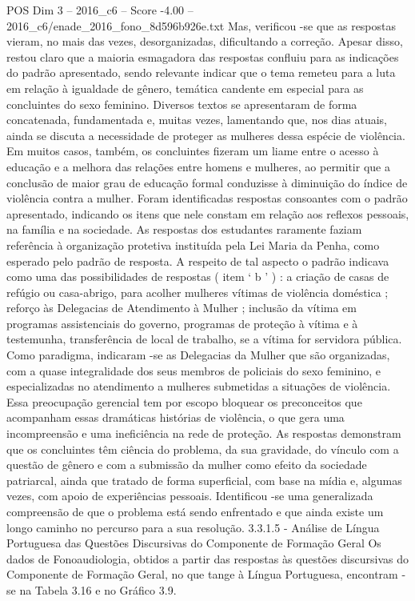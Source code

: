 \begin{textsample}{POS Dim 3 – 2016\_c6 – Score -4.00 – 2016\_c6/enade\_2016\_fono\_8d596b926e.txt}
Mas, verificou -se que as respostas vieram, no mais das vezes, desorganizadas, dificultando a correção.
Apesar disso, restou claro que a maioria esmagadora das respostas confluiu para as indicações do padrão apresentado, sendo relevante indicar que o tema remeteu para a luta em relação à igualdade de gênero, temática candente em especial para as concluintes do sexo feminino.
Diversos textos se apresentaram de forma concatenada, fundamentada e, muitas vezes, lamentando que, nos dias atuais, ainda se discuta a necessidade de proteger as mulheres dessa espécie de violência.
Em muitos casos, também, os concluintes fizeram um liame entre o acesso à educação e a melhora das relações entre homens e mulheres, ao permitir que a conclusão de maior grau de educação formal conduzisse à diminuição do índice de violência contra a mulher.
Foram identificadas respostas consoantes com o padrão apresentado, indicando os itens que nele constam em relação aos reflexos pessoais, na família e na sociedade.
As respostas dos estudantes raramente faziam referência à organização protetiva instituída pela Lei Maria da Penha, como esperado pelo padrão de resposta.
A respeito de tal aspecto o padrão indicava como uma das possibilidades de respostas ( item ‘ b ’ ) : a criação de casas de refúgio ou casa-abrigo, para acolher mulheres vítimas de violência doméstica ; reforço às Delegacias de Atendimento à Mulher ; inclusão da vítima em programas assistenciais do governo, programas de proteção à vítima e à testemunha, transferência de local de trabalho, se a vítima for servidora pública.
Como paradigma, indicaram -se as Delegacias da Mulher que são organizadas, com a quase integralidade dos seus membros de policiais do sexo feminino, e especializadas no atendimento a mulheres submetidas a situações de violência.
Essa preocupação gerencial tem por escopo bloquear os preconceitos que acompanham essas dramáticas histórias de violência, o que gera uma incompreensão e uma ineficiência na rede de proteção.
As respostas demonstram que os concluintes têm ciência do problema, da sua gravidade, do vínculo com a questão de gênero e com a submissão da mulher como efeito da sociedade patriarcal, ainda que tratado de forma superficial, com base na mídia e, algumas vezes, com apoio de experiências pessoais.
Identificou -se uma generalizada compreensão de que o problema está sendo enfrentado e que ainda existe um longo caminho no percurso para a sua resolução. 3.3.1.5 - Análise de Língua Portuguesa das Questões Discursivas do Componente de Formação Geral Os dados de Fonoaudiologia, obtidos a partir das respostas às questões discursivas do Componente de Formação Geral, no que tange à Língua Portuguesa, encontram -se na Tabela 3.16 e no Gráfico 3.9.

\end{textsample}
